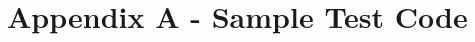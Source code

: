 \documentclass[12pt,letterpaper]{article}
\begin{document}
\begin{comment}
\item Do the related fuel cycle facilities exit upon demand decrease?
\begin{verbatim}
TEST(ReactorTests, DDDeploy_NO) {
    [Example input with the following attributes:]
        [int simdur = 20;]
        [Defines reactor with zero refueling cycle and operation 
        cycle of 1 month]
        [Defines fuel cycle facilities parameters]
        [Defines Reactor Deploy Scheme / Power Demand]
        [Decreasing Fuel Demand with Time]
    [Run test]
    [Test if fuel facility is deployed in the beginning]
    [Test if fuel facility exits later in the simulation (have 
    analytic solution)]
}
\end{verbatim}


\end{enumerate}





\section{Advanced Fuel Cycles}
\end{comment}

\section{Appendix A - Sample Test Code }
\end{document}
